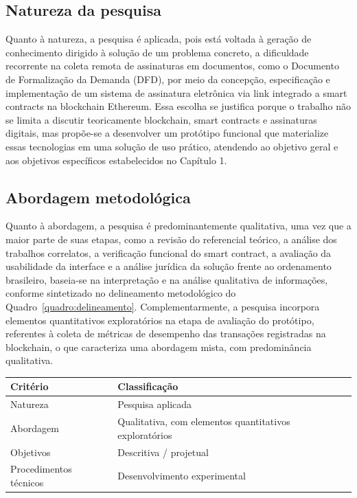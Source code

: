 \documentclass[
    12pt,
    a4paper,
    oneside,
    chapter=TITLE,
    section=TITLE,
    subsection=TITLE,
    subsubsection=TITLE,
    sumario=tradicional,
    english,
    brazil
]{abntex2}
\begin{document}
\subsection{Natureza da pesquisa}

Quanto à natureza, a pesquisa é aplicada, pois está voltada à geração
de conhecimento dirigido à solução de um problema concreto, a
dificuldade recorrente na coleta remota de assinaturas em documentos,
como o Documento de Formalização da Demanda (DFD), por meio da
concepção, especificação e implementação de um sistema de assinatura
eletrônica via link integrado a smart contracts na blockchain Ethereum.
Essa escolha se justifica porque o trabalho não se limita a discutir
teoricamente blockchain, smart contracts e assinaturas digitais, mas
propõe-se a desenvolver um protótipo funcional que materialize essas
tecnologias em uma solução de uso prático, atendendo ao objetivo
geral e aos objetivos específicos estabelecidos no Capítulo 1.

\subsection{Abordagem metodológica}

Quanto à abordagem, a pesquisa é predominantemente qualitativa, uma
vez que a maior parte de suas etapas, como a revisão do referencial
teórico, a análise dos trabalhos correlatos, a verificação funcional
do smart contract, a avaliação da usabilidade da interface e a
análise jurídica da solução frente ao ordenamento brasileiro,
baseia-se na interpretação e na análise qualitativa de informações,
conforme sintetizado no delineamento metodológico do
Quadro~\ref{quadro:delineamento}. Complementarmente, a pesquisa
incorpora elementos quantitativos exploratórios na etapa de avaliação
do protótipo, referentes à coleta de métricas de desempenho das
transações registradas na blockchain, o que caracteriza uma
abordagem mista, com predominância qualitativa.

\begin{quadro}[htb]
    \caption{Delineamento metodológico da pesquisa}
    \label{quadro:delineamento}
    \centering
    \begin{tabular}{ll}
        \toprule
        \textbf{Critério} & \textbf{Classificação} \\
        \midrule
        Natureza & Pesquisa aplicada \\
        Abordagem & Qualitativa, com elementos quantitativos exploratórios \\
        Objetivos & Descritiva / projetual \\
        Procedimentos técnicos & Desenvolvimento experimental \\
        \bottomrule
    \end{tabular}
\end{quadro}
\end{document}
